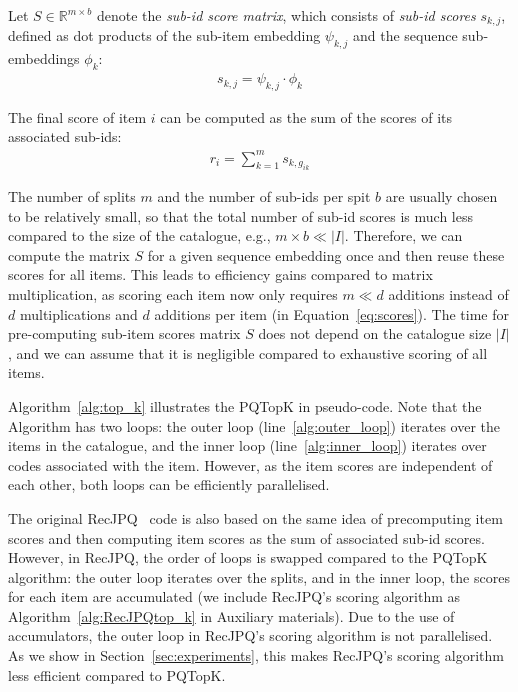 \documentclass[sigconf,natbib=true, review=true]{acmart} %
\newcommand{\pageenlarge}[1]{\marginnote{}\enlargethispage{#1\baselineskip}}
\newcommand{\sasha}[1]{\textcolor[HTML]{000000}{#1}}
\newcommand{\rsasha}[1]{\textcolor[HTML]{FF0000}{#1}}
\begin{document}
Let $S \in \mathbb{R}^{m \times b}$ denote the \emph{sub-id score matrix}, which consists of \emph{sub-id scores} $s_{k,j}$, defined as dot products of the sub-item embedding $\psi_{k,j}$ and the sequence sub-embeddings $\phi_k$:
\begin{align}
s_{k,j} = \psi_{k,j} \cdot \phi_k\label{eq:sub_item_scores}
\end{align}

The final score of item $i$ can be computed as the sum of the scores of its associated sub-ids:
\begin{align}
   r_{i} = \sum_{k=1}^m s_{k,g_{ik}} \label{eq:sum_sub_scores}
\end{align}

The number of splits $m$ and the number of sub-ids per spit $b$ are usually chosen to be relatively small, 
so that the total number of sub-id scores is much less compared to the size of the catalogue, e.g., $m\times b \ll |I|$.
%
Therefore, we can \rsasha{compute} the matrix $S$ \sasha{for a given sequence embedding} once and then reuse these scores for all items. This leads to efficiency gains compared to matrix multiplication, as scoring each item now only requires $m \ll d$ additions instead of $d$ multiplications and $d$ additions per item (in Equation~\eqref{eq:scores}). The time for pre-computing sub-item scores matrix $S$ does not depend on the catalogue size $|I|$, and %
we can assume that it is negligible compared to exhaustive scoring of all items. 

Algorithm~\ref{alg:top_k} illustrates the PQTopK in pseudo-code. Note that the Algorithm has two loops: the outer loop (line~\ref{alg:outer_loop}) iterates over the items in the catalogue, and the inner loop (line~\ref{alg:inner_loop}) iterates over codes associated with the item. However, as the item scores are independent of each other, both loops can be efficiently parallelised. 

The original RecJPQ~\cite{petrovRecJPQTrainingLargeCatalogue2024} code is also based on the same idea of precomputing item scores and then computing item scores as the sum of associated sub-id scores. However, in RecJPQ, the order of loops is swapped compared to the PQTopK algorithm: the outer loop iterates over the splits, and in the inner loop, the scores for each item are accumulated (we include RecJPQ's scoring algorithm as  Algorithm~\ref{alg:RecJPQtop_k} in Auxiliary materials). Due to the use of accumulators, the outer loop in RecJPQ's scoring algorithm is not parallelised. As we show in Section~\ref{sec:experiments}, this makes RecJPQ's scoring algorithm less efficient compared to PQTopK. 
\end{document}
